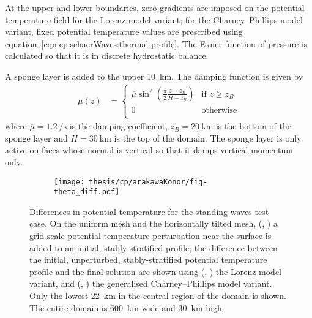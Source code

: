 At the upper and lower boundaries, zero gradients are imposed on the potential temperature field for the Lorenz model variant; for the Charney--Phillips model variant, fixed potential temperature values are prescribed using equation~\ref{eqn:cp:schaerWaves:thermal-profile}.
The Exner function of pressure is calculated so that it is in discrete hydrostatic balance.

A sponge layer is added to the upper \SI{10}{\kilo\meter}.  The damping function is given by
\begin{align}
	\mu(z) &= \begin{cases}
		\overline{\mu} \sin^2 \left( \frac{\pi}{2} \frac{z - z_B}{H - z_B} \right) & \text{if } z \geq z_B \\
		0 & \text{otherwise} \\
	\end{cases}
\end{align}
where $\overline{\mu} = \SI{1.2}{\per\second}$ is the damping coefficient, $z_B = \SI{20}{\kilo\meter}$ is the bottom of the sponge layer and $H = \SI{30}{\kilo\meter}$ is the top of the domain.
The sponge layer is only active on faces whose normal is vertical so that it damps vertical momentum only.


\begin{figure}
	\centering
	\begin{subfigure}{\textwidth}
		\label{fig:cp:arakawaKonor:theta_diff:uniform:initial}
		\label{fig:cp:arakawaKonor:theta_diff:uniform:lorenz}
		\label{fig:cp:arakawaKonor:theta_diff:uniform:cp}
		\label{fig:cp:arakawaKonor:theta_diff:hEdgeGrading:initial}
		\label{fig:cp:arakawaKonor:theta_diff:hEdgeGrading:lorenz}
		\label{fig:cp:arakawaKonor:theta_diff:hEdgeGrading:cp}
		\texttt{[image: thesis/cp/arakawaKonor/fig-theta\_diff.pdf]}
	\end{subfigure}
%
	\caption{Differences in potential temperature for the standing waves test case.
	On the uniform mesh and the horizontally tilted mesh,
	(,
	)
	a grid-scale potential temperature perturbation near the surface is added to an initial, stably-stratified profile;
the difference between the initial, unperturbed, stably-stratified potential temperature profile and the final solution are shown using
	(,
	)
	the Lorenz model variant, and 
	(,
	)
	the generalised Charney--Phillips model variant.
Only the lowest \SI{22}{\kilo\meter} in the central region of the domain is shown.  The entire domain is \SI{600}{\kilo\meter} wide and \SI{30}{\kilo\meter} high.
	}
	\label{fig:cp:arakawaKonor:theta_diff}
\end{figure}

